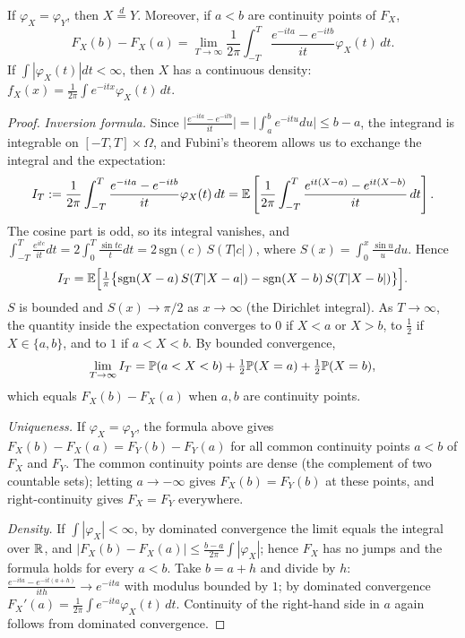 \documentclass[main.tex]{subfiles}
\begin{document}
\begin{theorem}\label{thm:teklik}
If $\varphi_X=\varphi_Y$, then $X\overset d= Y$. Moreover, if $a<b$ are continuity points of $F_X$,
\[
F_X(b)-F_X(a)=\lim_{T\to\infty}\frac1{2\pi}\int_{-T}^{T}\frac{e^{-ita}-e^{-itb}}{it}\varphi_X(t)\,dt .
\]
If $\int|\varphi_X(t)|dt<\infty$, then $X$ has a continuous density: $f_X(x)=\frac1{2\pi}\int e^{-itx}\varphi_X(t)\,dt$.
\end{theorem}
\begin{proof}
\emph{Inversion formula.} Since $\big|\frac{e^{-ita}-e^{-itb}}{it}\big|=\big|\int_a^be^{-itu}du\big|\le b-a$, the integrand is integrable on $[-T,T]\times\Omega$, and Fubini's theorem allows us to exchange the integral and the expectation:
\[
I_T:=\frac1{2\pi}\int_{-T}^{T}\frac{e^{-ita}-e^{-itb}}{it}\varphi_X(t)\,dt
=\E\left[\frac1{2\pi}\int_{-T}^{T}\frac{e^{it(X-a)}-e^{it(X-b)}}{it}\,dt\right].
\]
The cosine part is odd, so its integral vanishes, and $\int_{-T}^{T}\frac{e^{itc}}{it}dt=2\int_0^T\frac{\sin tc}{t}dt=2\,\mathrm{sgn}(c)\,S(T|c|)$, where $S(x)=\int_0^x\frac{\sin u}{u}du$. Hence
\[
I_T=\E\Big[\tfrac1\pi\big\{\mathrm{sgn}(X-a)\,S(T|X-a|)-\mathrm{sgn}(X-b)\,S(T|X-b|)\big\}\Big].
\]
$S$ is bounded and $S(x)\to\pi/2$ as $x\to\infty$ (the Dirichlet integral). As $T\to\infty$, the quantity inside the expectation converges to $0$ if $X<a$ or $X>b$, to $\tfrac12$ if $X\in\{a,b\}$, and to $1$ if $a<X<b$. By bounded convergence,
\[
\lim_{T\to\infty}I_T=\P(a<X<b)+\tfrac12\P(X=a)+\tfrac12\P(X=b),
\]
which equals $F_X(b)-F_X(a)$ when $a,b$ are continuity points.

\emph{Uniqueness.} If $\varphi_X=\varphi_Y$, the formula above gives $F_X(b)-F_X(a)=F_Y(b)-F_Y(a)$ for all common continuity points $a<b$ of $F_X$ and $F_Y$. The common continuity points are dense (the complement of two countable sets); letting $a\to-\infty$ gives $F_X(b)=F_Y(b)$ at these points, and right-continuity gives $F_X=F_Y$ everywhere.

\emph{Density.} If $\int|\varphi_X|<\infty$, by dominated convergence the limit equals the integral over $\R$, and $|F_X(b)-F_X(a)|\le\frac{b-a}{2\pi}\int|\varphi_X|$; hence $F_X$ has no jumps and the formula holds for every $a<b$. Take $b=a+h$ and divide by $h$: $\frac{e^{-ita}-e^{-it(a+h)}}{ith}\to e^{-ita}$ with modulus bounded by $1$; by dominated convergence $F_X'(a)=\frac1{2\pi}\int e^{-ita}\varphi_X(t)\,dt$. Continuity of the right-hand side in $a$ again follows from dominated convergence.
\end{proof}
\end{document}
